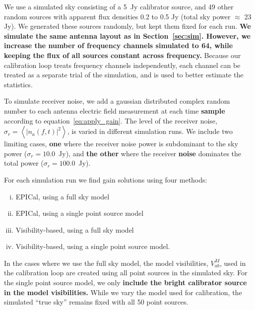 \documentclass[a4paper,fleqn,usenatbib]{../mnras}
\begin{document}
We use a simulated sky consisting of a 5~Jy calibrator source, and 49 other random sources 
with apparent flux densities 0.2 to 0.5 Jy (total sky power $\approx$ 23 Jy). We generated 
these sources randomly, but kept them fixed for each run. 
\textbf{We simulate the same antenna layout as in Section~\ref{sec:sim}. 
However, we increase the number of frequency channels simulated to 64, while keeping the flux of all sources constant across frequency.}
Because our calibration loop treats 
frequency channels independently, each channel can be treated as a separate trial of the 
simulation, and is used to better estimate the statistics.

To simulate receiver noise, we add a gaussian distributed complex random number to each 
antenna electric field measurement at each time \textbf{sample} according to 
equation~\ref{eq:apply_gain}. The level of the receiver noise, $\sigma_r = \left<\left|
n_a(f,t)\right|^2\right>$, is varied in different simulation runs. We include two limiting 
cases, \textbf{one} where the receiver noise power is subdominant to the sky power ($\sigma_r = 
10.0$~Jy), and \textbf{the other} where the receiver \textbf{noise} dominates the total power ($\sigma_r=100.0$~Jy).

For each simulation run we find gain solutions using four methods:
\begin{enumerate}[i.]
\item EPICal, using a full sky model
\item EPICal, using a single point source model
\item Visibility-based, using a full sky model
\item Visibility-based, using a single point source model.
\end{enumerate}
In the cases where we use the full sky model, the model visibilities, $V^M_{ab}$, used in the 
calibration loop are created using all point sources in the simulated sky. For the single point 
source model, we only \textbf{include the bright calibrator source in the model visibilities.}
While we vary the model used for calibration, the simulated ``true sky'' remains fixed with all 50 
point sources.
\end{document}
